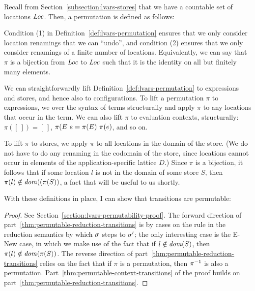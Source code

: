 Recall from Section~\ref{subsection:lvars-stores} that we have a
countable set of locations $\mathit{Loc}$.  Then, a permutation is defined as
follows:

\LVarsDefPermutation

Condition (1) in Definition~\ref{def:lvars-permutation} ensures that
we only consider location renamings that we can ``undo'', and
condition (2) ensures that we only consider renamings of a finite
number of locations.  Equivalently, we can say that $\pi$ is a
bijection from $\mathit{Loc}$ to $\mathit{Loc}$ such that it is the identity on all
but finitely many elements.

We can straightforwardly lift Definition~\ref{def:lvars-permutation}
to expressions and stores, and hence also to configurations.  To lift
a permutation $\pi$ to expressions, we over the syntax of terms
structurally and apply $\pi$ to any locations that occur in the term.
We can also lift $\pi$ to evaluation contexts, structurally: $\pi([~])
= [~]$, $\pi(E~e = \pi(E)~\pi(e)$, and so on.

To lift $\pi$ to stores, we apply $\pi$ to all locations in the domain
of the store.  (We do not have to do any renaming in the codomain of
the store, since locations cannot occur in elements of the
application-specific lattice $D$.)  Since $\pi$ is a bijection, it
follows that if some location $l$ is not in the domain of some store
$S$, then $\pi(l) \notin \mathit{dom}((\pi(S))$, a fact that will be useful to us shortly.

\LVarsDefPermutationExpression

\LVarsDefPermutationStore

\LVarsDefPermutationConfiguration

With these definitions in place, I can show that transitions are
permutable:

\LVarsLemPermutability
\begin{proof}
  See Section~\ref{section:lvars-permutability-proof}.  The forward
  direction of part~\ref{thm:permutable-reduction-transitions} is by
  cases on the rule in the reduction semantics by which $\sigma$ steps
  to $\sigma'$; the only interesting case is the {\sc E-New} case, in
  which we make use of the fact that if $l \notin \mathit{dom}(S)$, then
  $\pi(l) \notin \mathit{dom}(\pi(S))$. The reverse direction of
  part~\ref{thm:permutable-reduction-transitions} relies on the fact
  that if $\pi$ is a permutation, then $\pi^{-1}$ is also a permutation.
  Part~\ref{thm:permutable-context-transitions} of the proof builds on
  part~\ref{thm:permutable-reduction-transitions}.
\end{proof}

